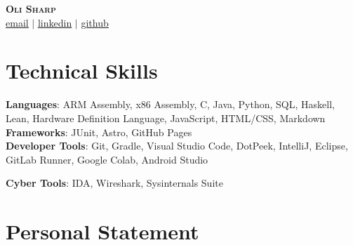 \documentclass[letterpaper,11pt]{article}
\begin{document}

\begin{center}
    \textbf{\Huge \scshape Oli Sharp} \\ \vspace{1pt}
    \small \href{mailto:oli.sharp@outlook.com}{\underline{email}} $|$ 
    \href{https://www.linkedin.com/in/oli-sharp/}{\underline{linkedin}} $|$
    \href{https://github.com/oli-cs}{\underline{github}} 
\end{center}


\section{Technical Skills}
 \begin{itemize}[leftmargin=0.15in, label={}]
    \small{\item{
     \textbf{Languages}{: ARM Assembly, x86 Assembly, C, Java, Python, SQL, Haskell, Lean, Hardware Definition Language, JavaScript, HTML/CSS, Markdown} \\
     \textbf{Frameworks}{: JUnit, Astro, GitHub Pages} \\
     \textbf{Developer Tools}{: Git, Gradle, Visual Studio Code, DotPeek, IntelliJ, Eclipse, GitLab Runner, Google Colab, Android Studio} \\
    }}
    \textbf{Cyber Tools}{: IDA, Wireshark, Sysinternals Suite}
 \end{itemize}



\section{Personal Statement}
\end{document}
